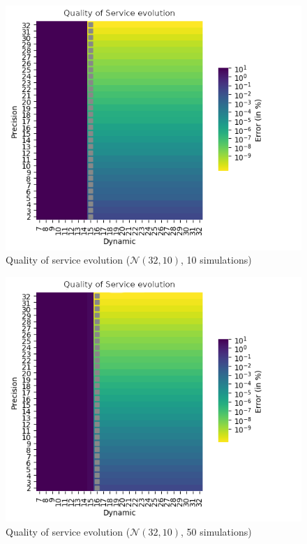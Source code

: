 \begin{figure}
    \centering
    \includegraphics[width=.8\textwidth]{Figures/results/d2-32_p2-32_e8-8_N32-10_s10-0.png}
    \caption{Quality of service evolution ($\mathcal{N}(32, 10)$, 10 simulations)}
    \label{app.quick:fig.qos32-10-10}
\end{figure}
\begin{figure}
    \centering
    \includegraphics[width=.8\textwidth]{Figures/results/d2-32_p2-32_e8-8_N32-10_s50-0.png}
    \caption{Quality of service evolution ($\mathcal{N}(32, 10)$, 50 simulations)}
    \label{app.quick:fig.qos32-10-50}
\end{figure}

